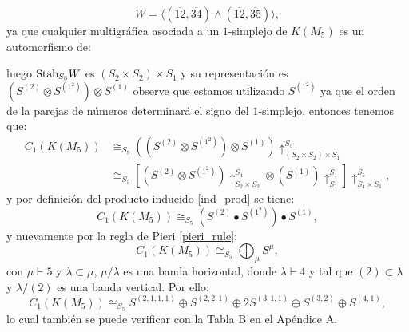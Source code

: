 \documentclass[12pt]{book}
\theoremstyle{definition}
\newcounter{in}
\newcounter{ini}
\begin{document}
 $$W = \langle (\overline{12},\overline{34}) \wedge  (\overline{12},\overline{35}) \rangle,$$
ya que cualquier multigráfica asociada a un $1$-simplejo de $K(M_{5})$ es un automorfismo de:
%
\begin{center}
\end{center}
luego $\textup{Stab}_{S_{5}} W$ es $(S_{2} \times S_{2}) \times S_{1}$ y su representación es $(S^{(2)} \otimes S^{(1^{2})}) \otimes S^{(1)}$ observe que estamos utilizando $S^{(1^{2})}$ ya que el orden de la parejas de números determinará el signo del $1$-simplejo, entonces tenemos que:
\begin{equation}
\begin{aligned}
C_{1}(K(M_{5})) & \cong_{S_{5}} ((S^{(2)} \otimes S^{(1^{2})}) \otimes S^{(1)})\uparrow_{(S_{2} \times S_{2}) \times S_{1}}^{S_{5}} \\
& \cong_{S_{5}} \left [ (S^{(2)} \otimes S^{(1^{2})})\uparrow_{S_{2} \times S_{2}}^{S_{4}} \otimes (S^{(1)})\uparrow_{S_{1}}^{S_{1}} \right ] \uparrow_{S_{4} \times S_{1}}^{S_{5}},
\end{aligned}
\end{equation}
y por definición del producto inducido \ref{ind_prod} se tiene:
\begin{equation}
C_{1}(K(M_{5})) \cong_{S_{5}} (S^{(2)} \bullet S^{(1^{2})}) \bullet S^{(1)}, 
\end{equation}
y nuevamente por la regla de Pieri \ref{pieri_rule}:
\begin{equation}
C_{1}(K(M_{5})) \cong_{S_{5}} \bigoplus_{\mu} S^{\mu}, 
\end{equation}
con $\mu \vdash 5$ y $\lambda \subset \mu$, $\mu / \lambda$ es una banda horizontal, donde $\lambda \vdash 4$ y tal que $(2) \subset \lambda$ y $\lambda / (2)$ es una banda vertical. Por ello:
\begin{equation}
C_{1}(K(M_{5})) \cong_{S_{5}} S^{(2,1,1,1)} \oplus S^{(2,2,1)} \oplus 2S^{(3,1,1)} \oplus S^{(3,2)} \oplus S^{(4,1)},
\end{equation}
lo cual también se puede verificar con la Tabla B en el Apéndice A.
\end{document}
